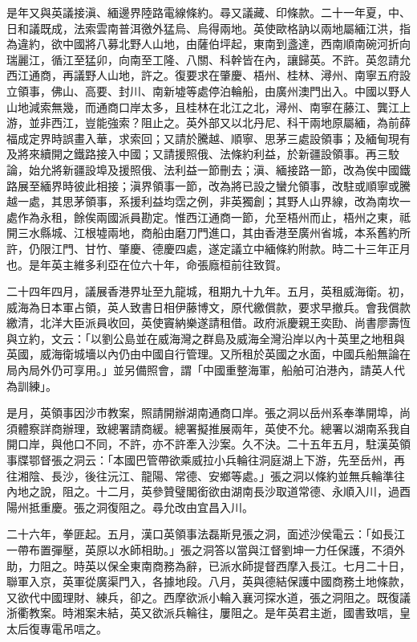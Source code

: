 \begin{pinyinscope}
是年又與英議接滇、緬邊界陸路電線條約。尋又議藏、印條款。二十一年夏，中、日和議既成，法索雲南普洱徼外猛烏、烏得兩地。英使歐格訥以兩地屬緬江洪，指為違約，欲中國將八募北野人山地，由薩伯坪起，東南到盞達，西南順南碗河折向瑞麗江，循江至猛卯，向南至工隆、八關、科幹皆在內，讓歸英。不許。英忽請允西江通商，再議野人山地，許之。復要求在肇慶、梧州、桂林、潯州、南寧五府設立領事，佛山、高要、封川、南新墟等處停泊輪船，由廣州澳門出入。中國以野人山地減索無幾，而通商口岸太多，且桂林在北江之北，潯州、南寧在藤江、龔江上游，並非西江，豈能強索？阻止之。英外部又以北丹尼、科干兩地原屬緬，為前薛福成定界時誤畫入華，求索回；又請於騰越、順寧、思茅三處設領事；及緬甸現有及將來續開之鐵路接入中國；又請援照俄、法條約利益，於新疆設領事。再三駮論，始允將新疆設埠及援照俄、法利益一節刪去；滇、緬接路一節，改為俟中國鐵路展至緬界時彼此相接；滇界領事一節，改為將已設之蠻允領事，改駐或順寧或騰越一處，其思茅領事，系援利益均霑之例，非英獨創；其野人山界線，改為南坎一處作為永租，餘俟兩國派員勘定。惟西江通商一節，允至梧州而止，梧州之東，祗開三水縣城、江根墟兩地，商船由磨刀門進口，其由香港至廣州省城，本系舊約所許，仍限江門、甘竹、肇慶、德慶四處，遂定議立中緬條約附款。時二十三年正月也。是年英主維多利亞在位六十年，命張廕桓前往致賀。

二十四年四月，議展香港界址至九龍城，租期九十九年。五月，英租威海衛。初，威海為日本軍占領，英人致書日相伊藤博文，原代繳償款，要求早撤兵。會我償款繳清，北洋大臣派員收回，英使竇納樂遂請租借。政府派慶親王奕劻、尚書廖壽恆與立約，文云：「以劉公島並在威海灣之群島及威海全灣沿岸以內十英里之地租與英國，威海衛城墻以內仍由中國自行管理。又所租於英國之水面，中國兵船無論在局內局外仍可享用。」並另備照會，謂「中國重整海軍，船舶可泊港內，請英人代為訓練」。

是月，英領事因沙市教案，照請開辦湖南通商口岸。張之洞以岳州系奉準開埠，尚須體察詳商辦理，致總署請商緩。總署擬推展兩年，英使不允。總署以湖南系我自開口岸，與他口不同，不許，亦不許牽入沙案。久不決。二十五年五月，駐漢英領事牒鄂督張之洞云：「本國巴管帶欲乘威拉小兵輪往洞庭湖上下游，先至岳州，再往湘陰、長沙，後往沅江、龍陽、常德、安鄉等處。」張之洞以條約並無兵輪準往內地之說，阻之。十二月，英參贊璧閣銜欲由湖南長沙取道常德、永順入川，過酉陽州抵重慶。張之洞復阻之。尋允改由宜昌入川。

二十六年，拳匪起。五月，漢口英領事法磊斯見張之洞，面述沙侯電云：「如長江一帶布置彈壓，英原以水師相助。」張之洞答以當與江督劉坤一力任保護，不須外助，力阻之。時英以保全東南商務為辭，已派水師提督西摩入長江。七月二十日，聯軍入京，英軍從廣渠門入，各據地段。八月，英與德結保護中國商務土地條款，又欲代中國理財、練兵，卻之。西摩欲派小輪入襄河探水道，張之洞阻之。既復議浙衢教案。時湘案未結，英又欲派兵輪往，屢阻之。是年英君主逝，國書致唁，皇太后復專電吊唁之。


\end{pinyinscope}
